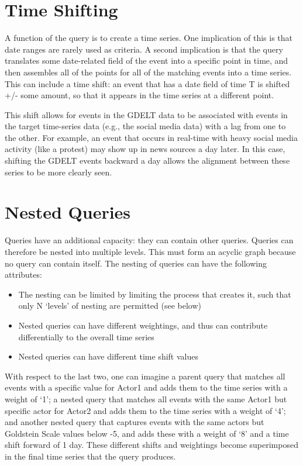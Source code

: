 \section{Time Shifting}
\par A function of the query is to create a time series. One implication of this is that date ranges are rarely used as criteria. A second implication is that the query translates some date-related field of the event into a specific point in time, and then assembles all of the points for all of the matching events into a time series. This can include a time shift: an event that has a date field of time T is shifted +/- some amount, so that it appears in the time series at a different point.

\par This shift allows for events in the GDELT data to be associated with events in the target time-series data (e.g., the social media data) with a lag from one to the other. For example, an event that occurs in real-time with heavy social media activity (like a protest) may show up in news sources a day later. In this case, shifting the GDELT events backward a day allows the alignment between these series to be more clearly seen.

\section{Nested Queries}
\par Queries have an additional capacity: they can contain other queries. Queries can therefore be nested into multiple levels. This must form an acyclic graph because no query can contain itself. The nesting of queries can have the following attributes:

\begin{itemize}
  \item The nesting can be limited by limiting the process that creates it, such that only N `levels' of nesting are permitted (see below)
  \item Nested queries can have different weightings, and thus can contribute differentially to the overall time series
  \item Nested queries can have different time shift values
\end{itemize}

\par With respect to the last two, one can imagine a parent query that matches all events with a specific value for Actor1 and adds them to the time series with a weight of `1'; a nested query that matches all events with the same Actor1 but specific actor for Actor2 and adds them to the time series with a weight of `4'; and another nested query that captures events with the same actors but Goldstein Scale values below -5, and adds these with a weight of `8' and a time shift forward of 1 day. These different shifts and weightings become superimposed in the final time series that the query produces.

